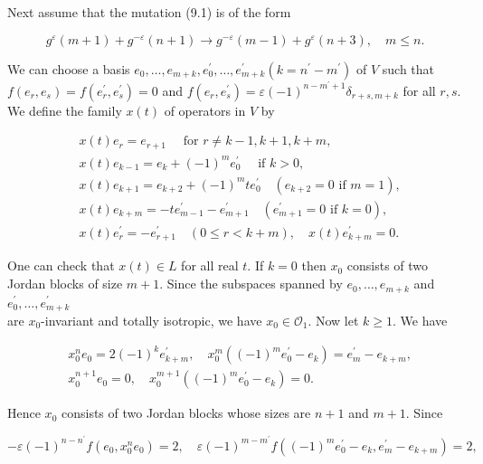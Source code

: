 \documentclass[10pt]{article}
\begin{document}
Next assume that the mutation (9.1) is of the form


\begin{equation*}
g^{\varepsilon}(m+1)+g^{-\varepsilon}(n+1) \rightarrow g^{-\varepsilon}(m-1)+g^{\varepsilon}(n+3), \quad m \leqslant n . \tag{12.10}
\end{equation*}


We can choose a basis $e_{0}, \ldots, e_{m+k}, e_{0}^{\prime}, \ldots, e_{m+k}^{\prime}\left(k=n^{\prime}-m^{\prime}\right)$ of $V$ such that $f\left(e_{r}, e_{s}\right)=f\left(e_{r}^{\prime}, e_{s}^{\prime}\right)=0$ and $f\left(e_{r}, e_{s}^{\prime}\right)=\varepsilon(-1)^{n-m^{\prime}+1} \delta_{r+s, m+k}$ for all $r, s$. We define the family $x(t)$ of operators in $V$ by

$$
\begin{aligned}
& x(t) e_{r}=e_{r+1} \quad \text { for } r \neq k-1, k+1, k+m, \\
& x(t) e_{k-1}=e_{k}+(-1)^{m} e_{0}^{\prime} \quad \text { if } k>0, \\
& x(t) e_{k+1}=e_{k+2}+(-1)^{m} t e_{0}^{\prime} \quad\left(e_{k+2}=0 \text { if } m=1\right), \\
& x(t) e_{k+m}=-t e_{m-1}^{\prime}-e_{m+1}^{\prime} \quad\left(e_{m+1}^{\prime}=0 \text { if } k=0\right), \\
& x(t) e_{r}^{\prime}=-e_{r+1}^{\prime} \quad(0 \leqslant r<k+m), \quad x(t) e_{k+m}^{\prime}=0 .
\end{aligned}
$$

One can check that $x(t) \in L$ for all real $t$. If $k=0$ then $x_{0}$ consists of two Jordan blocks of size $m+1$. Since the subspaces spanned by $e_{0}, \ldots, e_{m+k}$ and $e_{0}^{\prime}, \ldots, e_{m+k}^{\prime}$\\
are $x_{0}$-invariant and totally isotropic, we have $x_{0} \in \mathcal{O}_{1}$. Now let $k \geqslant 1$. We have

$$
\begin{aligned}
& x_{0}^{n} e_{0}=2(-1)^{k} e_{k+m}^{\prime}, \quad x_{0}^{m}\left((-1)^{m} e_{0}^{\prime}-e_{k}\right)=e_{m}^{\prime}-e_{k+m}, \\
& x_{0}^{n+1} e_{0}=0, \quad x_{0}^{m+1}\left((-1)^{m} e_{0}^{\prime}-e_{k}\right)=0 .
\end{aligned}
$$

Hence $x_{0}$ consists of two Jordan blocks whose sizes are $n+1$ and $m+1$. Since

$$
-\varepsilon(-1)^{n-n^{\prime}} f\left(e_{0}, x_{0}^{n} e_{0}\right)=2, \quad \varepsilon(-1)^{m-m^{\prime}} f\left((-1)^{m} e_{0}^{\prime}-e_{k}, e_{m}^{\prime}-e_{k+m}\right)=2,
$$
\end{document}
